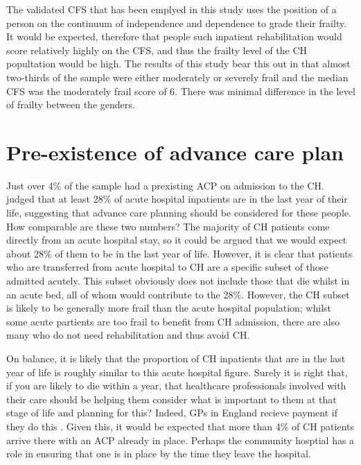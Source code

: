 \documentclass
[
	12pt,
	a4paper,
	oneside,
]{report}
\begin{document}
The validated CFS that has been emplyed in this study uses the position of a person
on the continuum of independence and dependence to grade their frailty. It
would be expected, therefore that people such inpatient rehabilitation 
would score relatively highly on the CFS, and thus the frailty level of the 
CH popultation would be high. The results of this study bear this out in that
almost two-thirds of the sample were either moderately or severely frail
and the median CFS was the moderately frail score of 6. There was minimal
difference in the level of frailty between the genders.

\section{Pre-existence of advance care plan}

Just over 4\% of the sample had a prexisting ACP on admission to the CH. 
\textcite{clarke:14} judged that at least 28\% of acute hospital 
inpatients are in the last year of their life, suggesting that advance care 
planning should be considered for these people. How comparable are these two
numbers? The majority of CH patients come directly from an acute hospital
stay, so it could be argued that we would expect about 28\% of them to be in
the last year of life. However, it is clear that patients who are transferred 
from acute hospital to CH are a specific subset of those admitted acutely.
This subset obviously does not include those that die whilst in an acute bed,
all of whom would contribute to the 28\%.  However, the CH subset is likely 
to be generally more frail than the acute hospital population; whilst some
acute partients are too frail to benefit from CH admission, there are also many 
who do not need rehabilitation and thus avoid CH.

On balance, it is likely that the proportion of CH inpatients that are in the
last year of life is roughly similar to this acute hospital figure. Surely it
is right that, if you are likely to die within a year, that healthcare
professionals involved with their care should be helping them consider what
is important to them at that stage of life and planning for this? Indeed,
GPs in England recieve payment if they do this \parencite{hunt:16}. Given
this, it would be expected that more than 4\% of CH patients arrive there
with an ACP already in place. Perhaps the community hosptial has a role in
ensuring that one is in place by the time they leave the hospital.
\end{document}
